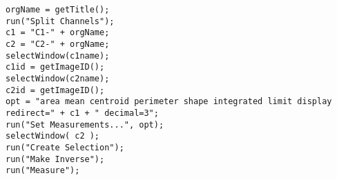 \begin{lstlisting}[morekeywords={*, c1, c2, opt, getTitle}]
orgName = getTitle();
run("Split Channels");
c1 = "C1-" + orgName;
c2 = "C2-" + orgName;
selectWindow(c1name);
c1id = getImageID();
selectWindow(c2name);
c2id = getImageID();
opt = "area mean centroid perimeter shape integrated limit display redirect=" + c1 + " decimal=3";
run("Set Measurements...", opt);
selectWindow( c2 );
run("Create Selection");
run("Make Inverse");
run("Measure");

\end{lstlisting}